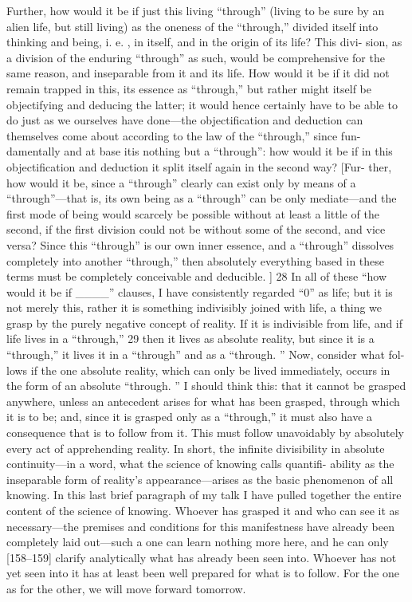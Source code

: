 Further, how would it be if just this living “through” (living to be sure by
an alien life, but still living) as the oneness of the “through,” divided
itself into thinking and being, i.
e.
, in itself, and in the origin of its life? This divi-
sion, as a division of the enduring “through” as such, would be comprehensive
for the same reason, and inseparable from it and its life.
 How would it be if it
did not remain trapped in this, its essence as “through,” but rather might itself
be objectifying and deducing the latter; it would hence certainly have to be
able to do just as we ourselves have done—the objectification and deduction
can themselves come about according to the law of the “through,” since fun-
damentally and at base itis nothing but a “through”: how would it be if in
this objectification and deduction it split itself again in the second way? [Fur-
ther, how would it be, since a “through” clearly can exist only by means of a
“through”—that is, its own being as a “through” can be only mediate—and the
first mode of being would scarcely be possible without at least a little of the
second, if the first division could not be without some of the second, and vice
versa? Since this “through” is our own inner essence, and a “through” dissolves
completely into another “through,” then absolutely everything based in these
terms must be completely conceivable and deducible.
] 28 In all of these “how
would it be if ____” clauses, I have consistently regarded “0” as life; but it is
not merely this, rather it is something indivisibly joined with life, a thing we
grasp by the purely negative concept of reality.
 If it is indivisible from life, and
if life lives in a “through,” 29 then it lives as absolute reality, but since it is a
“through,” it lives it in a “through” and as a “through.
” Now, consider what fol-
lows if the one absolute reality, which can only be lived immediately, occurs in
the form of an absolute “through.
” I should think this: that it cannot be grasped
anywhere, unless an antecedent arises for what has been grasped, through
which it is to be; and, since it is grasped only as a “through,” it must also have
a consequence that is to follow from it.
 This must follow unavoidably by
absolutely every act of apprehending reality.
 In short, the infinite divisibility
in absolute continuity—in a word, what the science of knowing calls quantifi-
ability as the inseparable form of reality’s appearance—arises as the basic
phenomenon of all knowing.
In this last brief paragraph of my talk I have pulled together the entire
content of the science of knowing.
 Whoever has grasped it and who can see
it as necessary—the premises and conditions for this manifestness have
already been completely laid out—such a one can learn nothing more here,
and he can only [158–159] clarify analytically what has already been seen into.
Whoever has not yet seen into it has at least been well prepared for what is to
follow.
 For the one as for the other, we will move forward tomorrow.


